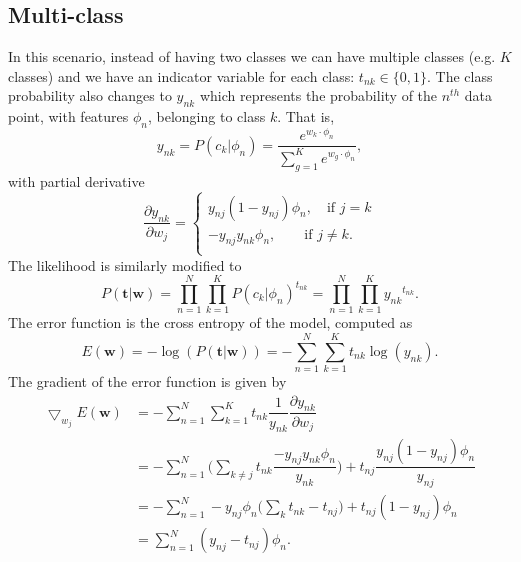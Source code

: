 \documentclass{article}
\begin{document}
\subsection{Multi-class}
In this scenario, instead of having two classes we can have multiple classes (e.g. $K$ classes) and we have an indicator variable for each class: $t_{nk}\in \{0,1\}$. The class probability also changes to $y_{nk}$ which represents the probability of the $n^{th}$ data point, with features $\phi_n$, belonging to class $k$. That is,
\begin{equation}
    y_{nk} = P(c_k|\phi_n) = \dfrac{e^{w_k \cdot\phi_n}}{\sum_{g=1}^K e^{w_g\cdot\phi_n}},
\end{equation}
with partial derivative
\begin{equation}
    \dfrac{\partial y_{nk}}{\partial w_j} =  \left\{
                \begin{array}{ll}
                 y_{nj}(1-y_{nj})\phi_n, \quad \text{if $j=k$}\\
                  -y_{nj}y_{nk}\phi_n, \qquad \text{if $j \neq k$}.\\
                \end{array}
              \right.
\end{equation}
The likelihood is similarly modified to
\begin{equation}
    P(\textbf{t}|\textbf{w}) = \prod_{n=1}^N \prod_{k=1}^K P(c_k|\phi_n)^{t_{nk}} = \prod_{n=1}^N \prod_{k=1}^K {y_{nk}}^{t_{nk}} .
\end{equation}
The error function is the cross entropy of the model, computed as
\begin{equation}
    E(\textbf{w}) = -\log(P(\textbf{t}|\textbf{w})) = -\sum_{n=1}^N \sum_{k=1}^K t_{nk} \log(y_{nk}).
\end{equation}
The gradient of the error function is given by
\begin{equation}
\begin{split}
    \bigtriangledown_{w_j} E(\textbf{w}) &=
    -\sum_{n=1}^N \sum_{k=1}^K t_{nk} \dfrac{1}{y_{nk}}\dfrac{\partial y_{nk}}{\partial w_j}\\
    &=-\sum_{n=1}^N \bigg(\sum_{k\neq j} t_{nk} \dfrac{-y_{nj}y_{nk}\phi_n}{y_{nk}}\bigg) + t_{nj}\dfrac{y_{nj}(1-y_{nj})\phi_n}{y_{nj}}\\
    &=-\sum_{n=1}^N -y_{nj}\phi_n \bigg(\sum_{k} t_{nk}-t_{nj}\bigg) + t_{nj}(1-y_{nj})\phi_n\\
    &=\sum_{n=1}^N (y_{nj}-t_{nj})\phi_n.
\end{split}
\end{equation}
\end{document}
